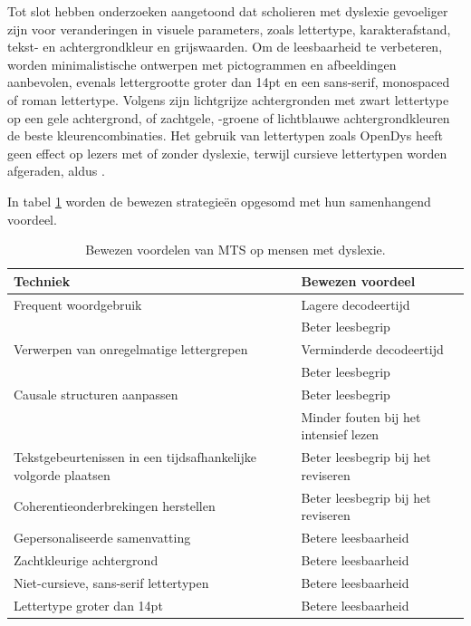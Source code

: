 \medspace

Tot slot hebben onderzoeken aangetoond dat scholieren met dyslexie gevoeliger zijn voor veranderingen in visuele parameters, zoals lettertype, karakterafstand, tekst- en achtergrondkleur en grijswaarden. Om de leesbaarheid te verbeteren, worden minimalistische ontwerpen met pictogrammen en afbeeldingen aanbevolen, evenals lettergrootte groter dan 14pt en een sans-serif, monospaced of roman lettertype. Volgens \textcite{Rello2015, Bezem2016, Rello2017} zijn lichtgrijze achtergronden met zwart lettertype op een gele achtergrond, of zachtgele, -groene of lichtblauwe achtergrondkleuren de beste kleurencombinaties. Het gebruik van lettertypen zoals OpenDys heeft geen effect op lezers met of zonder dyslexie, terwijl cursieve lettertypen worden afgeraden, aldus \textcite{Rello2013b, Rello2015}.

\medspace

In tabel \ref{table:benefits-mts} worden de bewezen strategieën opgesomd met hun samenhangend voordeel.

\medspace

\begin{center}
	\begin{table}[H]
	\begin{tabular}{ | m{7cm} | m{7cm} | } 
	\hline
	\textbf{Techniek} & \textbf{Bewezen voordeel} \\
	\hline
	Frequent woordgebruik & Lagere decodeertijd \\
	& Beter leesbegrip \\
	\hline	
	Verwerpen van onregelmatige lettergrepen & Verminderde decodeertijd \\
	& Beter leesbegrip \\	
	\hline
	Causale structuren aanpassen & Beter leesbegrip \\
	& Minder fouten bij het intensief lezen \\
	\hline	
	Tekstgebeurtenissen in een tijdsafhankelijke volgorde plaatsen & Beter leesbegrip bij het reviseren \\
	\hline
	Coherentieonderbrekingen herstellen & Beter leesbegrip bij het reviseren \\
	\hline
	Gepersonaliseerde samenvatting & Betere leesbaarheid \\
	\hline
	Zachtkleurige achtergrond & Betere leesbaarheid \\
	\hline
	Niet-cursieve, sans-serif lettertypen & Betere leesbaarheid \\
	\hline
	Lettertype groter dan 14pt & Betere leesbaarheid \\
	\hline
	\end{tabular}
	\caption{Bewezen voordelen van MTS op mensen met dyslexie.}
	\label{table:benefits-mts}
	\end{table}
\end{center}

